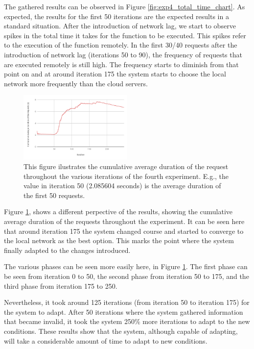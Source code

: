 \documentclass[conference]{IEEEtran}
\begin{document}
The gathered results can be observed in Figure \ref{fig:exp4_total_time_chart}. As
expected, the results for the first 50 iterations are the expected results in a
standard situation. After the introduction of network lag, we start to observe
spikes in the total time it takes for the function to be executed. This spikes
refer to the execution of the function remotely. In the first 30/40 requests after
the introduction of network lag (iterations 50 to 90), the frequency of requests
that are executed remotely is still high. The frequency starts to diminish
from that point on and at around iteration 175 the system starts to choose the
local network more frequently than the cloud servers.

\begin{figure}[h]
  \begin{center}
    \includegraphics[width=0.5\textwidth]{exp4_avg_chart.png}
    \caption{This figure ilustrates the cumulative average duration of
        the request throughout the various iterations of the fourth experiment.
        E.g., the value in iteration 50 (2.085604 seconds) is the average duration
        of the first 50 requests.}
    \label{fig:exp4_avg_chart}
  \end{center}
\end{figure}

Figure \ref{fig:exp4_avg_chart}, shows a different perpective of the results,
showing the cumulative average duration of the requests throughout the experiment.
It can be seen here that around iteration 175 the system changed course and
started to converge to the local network as the best option. This marks the point
where the system finally adapted to the changes introduced.

The various phases can be seen more easily here, in Figure
\ref{fig:exp4_avg_chart}. The first phase can be seen from iteration 0 to 50, the
second phase from iteration 50 to 175, and the third phase from iteration 175 to
250.

Nevertheless, it took around 125 iterations (from iteration 50 to iteration 175)
for the system to adapt. After 50 iterations where the system gathered information
that became invalid, it took the system 250\% more iterations to adapt to the new
conditions. These results show that the system, although capable of adapting, will
take a considerable amount of time to adapt to new conditions.
\end{document}
